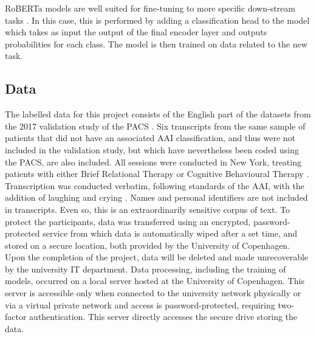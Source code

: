 \documentclass[12pt]{report}
\begin{document}
RoBERTa models are well suited for fine-tuning to more specific down-stream tasks .
In this case, this is performed by adding a classification head to the model which takes as input the output of the final encoder layer and outputs probabilities for each class.
The model is then trained on data related to the new task.

\subsection{Data}
The labelled data for this project consists of the English part of the datasets from the 2017 validation study of the PACS \cite{Talia2017}.
Six transcripts from the same sample of patients that did not have an associated AAI classification, and thus were not included in the validation study, but which have nevertheless been coded using the PACS, are also included.
All sessions were conducted in New York, treating patients with either Brief Relational Therapy \cite{Safran2000} or Cognitive Behavioural Therapy \cite{Beck2011}.
Transcription was conducted verbatim, following standards of the AAI, with the addition of laughing and crying \cite{Talia2017, Talia2014}.
Names and personal identifiers are not included in transcripts.
Even so, this is an extraordinarily sensitive corpus of text.
To protect the participants, data was transferred using an encrypted, password-protected service from which data is automatically wiped after a set time, and stored on a secure location, both provided by the University of Copenhagen.
Upon the completion of the project, data will be deleted and made unrecoverable by the university IT department.
Data processing, including the training of models, occurred on a local server hosted at the University of Copenhagen.
This server is accessible only when connected to the university network physically or via a virtual private network and access is password-protected, requiring two-factor authentication.
This server directly accesses the secure drive storing the data.
\end{document}
